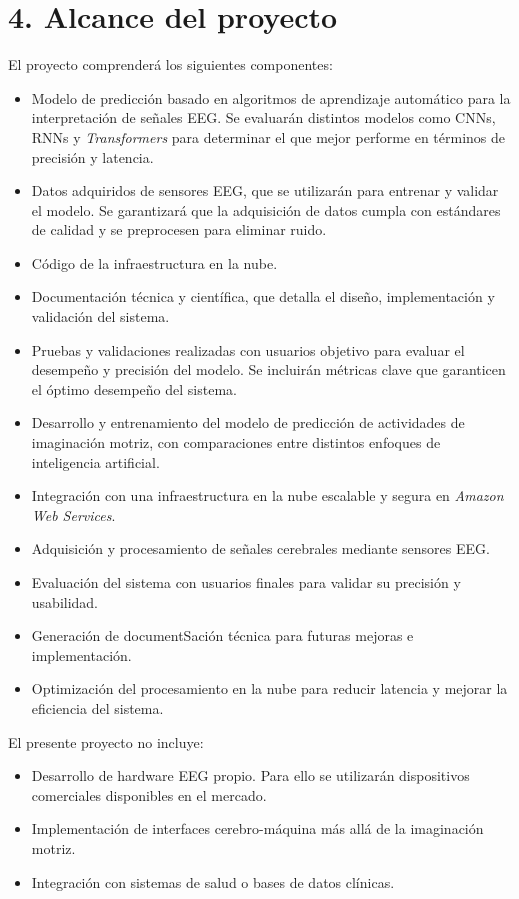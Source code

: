 \documentclass[
11pt, %
]{charter}
\begin{document}
\section{4. Alcance del proyecto}
\label{sec:alcance}

El proyecto comprenderá los siguientes componentes:
\begin{itemize}
	\item Modelo de predicción basado en algoritmos de aprendizaje automático para la interpretación de señales EEG. Se evaluarán distintos modelos como CNNs, RNNs y \textit{Transformers} para determinar el que mejor performe en términos de precisión y latencia.
	\item Datos adquiridos de sensores EEG, que se utilizarán para entrenar y validar el modelo. Se garantizará que la adquisición de datos cumpla con estándares de calidad y se preprocesen para eliminar ruido.
	\item Código de la infraestructura en la nube.
	\item Documentación técnica y científica, que detalla el diseño, implementación y validación del sistema.
	\item Pruebas y validaciones realizadas con usuarios objetivo para evaluar el desempeño y precisión del modelo. Se incluirán métricas clave que garanticen el óptimo desempeño del sistema.
	\item Desarrollo y entrenamiento del modelo de predicción de actividades de imaginación motriz, con comparaciones entre distintos enfoques de inteligencia artificial.
	\item Integración con una infraestructura en la nube escalable y segura en \textit{Amazon Web Services}.
	\item Adquisición y procesamiento de señales cerebrales mediante sensores EEG.
	\item Evaluación del sistema con usuarios finales para validar su precisión y usabilidad.
	\item Generación de documentSación técnica para futuras mejoras e implementación.
	\item Optimización del procesamiento en la nube para reducir latencia y mejorar la eficiencia del sistema.
\end{itemize}
El presente proyecto no incluye:
\begin{itemize}
	\item Desarrollo de hardware EEG propio. Para ello se utilizarán dispositivos comerciales disponibles en el mercado.
	\item Implementación de interfaces cerebro-máquina más allá de la imaginación motriz.
	\item Integración con sistemas de salud o bases de datos clínicas.
\end{itemize}
\end{document}
